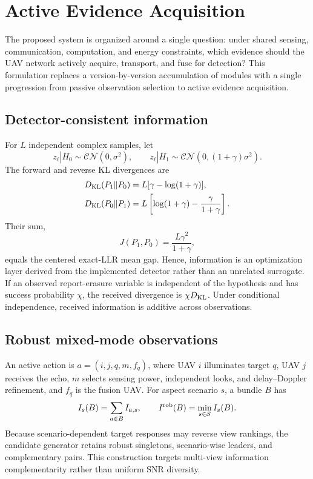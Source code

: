 \section{Active Evidence Acquisition}
\label{sec:active-evidence}

The proposed system is organized around a single question: under shared
sensing, communication, computation, and energy constraints, which evidence
should the UAV network actively acquire, transport, and fuse for detection?
This formulation replaces a version-by-version accumulation of modules with a
single progression from passive observation selection to active evidence
acquisition.

\subsection{Detector-consistent information}

For $L$ independent complex samples, let
\begin{equation}
z_\ell|H_0\sim\mathcal{CN}(0,\sigma^2),\qquad
z_\ell|H_1\sim\mathcal{CN}(0,(1+\gamma)\sigma^2).
\end{equation}
The forward and reverse KL divergences are
\begin{align}
D_{\rm KL}(P_1\Vert P_0)&=L[\gamma-\log(1+\gamma)],\\
D_{\rm KL}(P_0\Vert P_1)&=L\left[\log(1+\gamma)-
\frac{\gamma}{1+\gamma}\right].
\end{align}
Their sum,
\begin{equation}
J(P_1,P_0)=\frac{L\gamma^2}{1+\gamma},
\end{equation}
equals the centered exact-LLR mean gap. Hence, information is an optimization
layer derived from the implemented detector rather than an unrelated
surrogate. If an observed report-erasure variable is independent of the
hypothesis and has success probability $\chi$, the received divergence is
$\chi D_{\rm KL}$. Under conditional independence, received information is
additive across observations.

\subsection{Robust mixed-mode observations}

An active action is $a=(i,j,q,m,f_q)$, where UAV $i$ illuminates target $q$,
UAV $j$ receives the echo, $m$ selects sensing power, independent looks, and
delay--Doppler refinement, and $f_q$ is the fusion UAV. For aspect scenario
$s$, a bundle $B$ has
\begin{equation}
I_s(B)=\sum_{a\in B}I_{a,s},\qquad
I^{\rm rob}(B)=\min_{s\in\mathcal S}I_s(B).
\end{equation}
Because scenario-dependent target responses may reverse view rankings, the
candidate generator retains robust singletons, scenario-wise leaders, and
complementary pairs. This construction targets multi-view information
complementarity rather than uniform SNR diversity.


